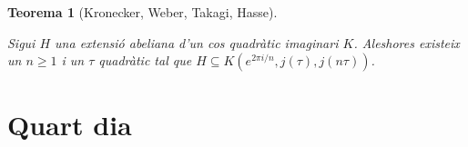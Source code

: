 \documentclass[
  letterpaper,
  DIV=11,
  numbers=noendperiod]{scrreprt}
\theoremstyle{plain}
\newtheorem{theorem}{Teorema}[chapter]
\theoremstyle{plain}
\theoremstyle{definition}
\theoremstyle{plain}
\theoremstyle{plain}
\theoremstyle{definition}
\theoremstyle{remark}
\begin{document}
\begin{theorem}[Kronecker, Weber, Takagi,
Hasse]\protect\hypertarget{thm-kronecker-weber-takagi-hasse}{}\label{thm-kronecker-weber-takagi-hasse}

Sigui \(H\) una extensió abeliana d'un cos quadràtic imaginari \(K\).
Aleshores existeix un \(n\geq 1\) i un \(\tau\) quadràtic tal que
\(H\subseteq K(e^{2\pi i/n}, j(\tau), j(n\tau))\).

\end{theorem}


\chapter{Quart dia}\label{quart-dia}

\providecommand{\QQ}{\mathbb{Q}}
\providecommand{\ZZ}{\mathbb{Z}}
\providecommand{\RR}{\mathbb{R}}
\providecommand{\FF}{\mathbb{F}}
\providecommand{\CC}{\mathbb{C}}
\providecommand{\HH}{\mathbb{H}}

\providecommand{\fX}{\mathfrak{X}}

\providecommand{\SL}{\operatorname{SL}}
\providecommand{\GL}{\operatorname{GL}}
\providecommand{\PSL}{\operatorname{PSL}}
\providecommand{\PGL}{\operatorname{PGL}}

\providecommand{\lto}{\longrightarrow}
\providecommand{\dfn}{\ensuremath{:=}}
\providecommand{\surjects}{\twoheadrightarrow}
\providecommand{\injects}{\hookrightarrow}
\providecommand{\id}{\ensuremath \text{Id}}
\providecommand{\tns}[1][]{\otimes_{\!#1}}
\providecommand{\mtx}[4]{\left(\begin{matrix}#1&#2\\#3&#4\end{matrix}\right)}
\providecommand{\mat}[1]{\left(\begin{matrix}#1\end{matrix}\right)}
\providecommand{\smat}[1]{\left(\begin{smallmatrix}#1\end{smallmatrix}\right)}
\providecommand{\smtx}[4]{\left(\begin{smallmatrix}#1&#2\\#3&#4\end{smallmatrix}\right)}

\providecommand{\slz}{\operatorname{SL}_2(\bZ)}
\providecommand{\to}{\longrightarrow}
\providecommand{\dlog}{\operatorname{dlog}}

\providecommand{\slsh}[1]{|_{#1}}
\end{document}
